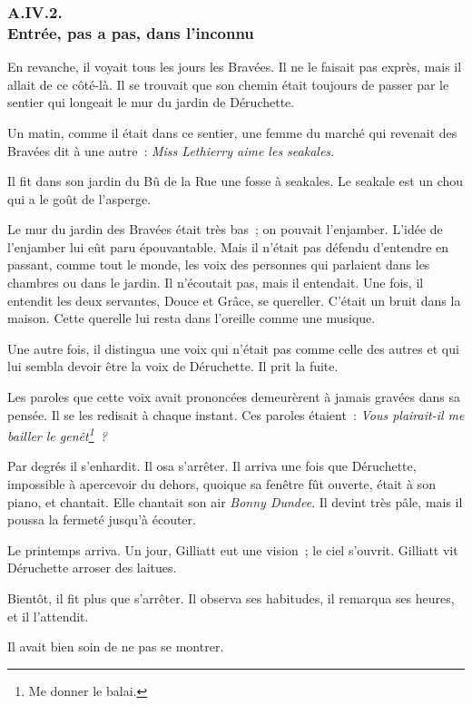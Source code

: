 \documentclass[french,twoside]{book} %
\begin{document}
 \subsubsection[{A.IV.2. Entrée, pas a pas, dans l’inconnu}]{A.IV.2. \\
Entrée, pas a pas, dans l’inconnu}
\noindent En revanche, il voyait tous les jours les Bravées. Il ne le faisait pas exprès, mais il allait de ce côté-là. Il se trouvait que son chemin était toujours de passer par le sentier qui longeait le mur du jardin de Déruchette.\par
Un matin, comme il était dans ce sentier, une femme du marché qui revenait des Bravées dit à une autre : \emph{Miss Lethierry aime les seakales.}\par
Il fit dans son jardin du Bû de la Rue une fosse à seakales. Le seakale est un chou qui a le goût de l’asperge.\par
Le mur du jardin des Bravées était très bas ; on pouvait l’enjamber. L’idée de l’enjamber lui eût paru épouvantable. Mais il n’était pas défendu d’entendre en passant, comme tout le monde, les voix des personnes qui parlaient dans les chambres ou dans le jardin. Il n’écoutait pas, mais il entendait. Une fois, il entendit les deux servantes, Douce et Grâce, se  quereller. C’était un bruit dans la maison. Cette querelle lui resta dans l’oreille comme une musique.\par
Une autre fois, il distingua une voix qui n’était pas comme celle des autres et qui lui sembla devoir être la voix de Déruchette. Il prit la fuite.\par
Les paroles que cette voix avait prononcées demeurèrent à jamais gravées dans sa pensée. Il se les redisait à chaque instant. Ces paroles étaient : \emph{Vous plairait-il me bailler le genêt\footnote{ \noindent Me donner le balai.
 } ?}\par
Par degrés il s’enhardit. Il osa s’arrêter. Il arriva une fois que Déruchette, impossible à apercevoir du dehors, quoique sa fenêtre fût ouverte, était à son piano, et chantait. Elle chantait son air \emph{Bonny Dundee}. Il devint très pâle, mais il poussa la fermeté jusqu’à écouter.\par
Le printemps arriva. Un jour, Gilliatt eut une vision ; le ciel s’ouvrit. Gilliatt vit Déruchette arroser des laitues.\par
Bientôt, il fit plus que s’arrêter. Il observa ses habitudes, il remarqua ses heures, et il l’attendit.\par
Il avait bien soin de ne pas se montrer.\par
\end{document}
